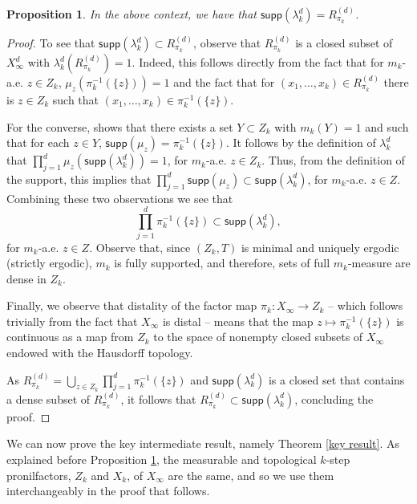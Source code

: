 \documentclass[reqno]{amsart}
\newcommand{\supp}{\mathsf{supp}}
\newtheorem{proposition}[theorem]{Proposition}
\theoremstyle{definition}
\theoremstyle{remark}
\begin{document}
\begin{proposition}\label{support trick}
In the above context, we have that $\supp(\lambda^d_k)=R^{(d)}_{\pi_k}$.    
\end{proposition}

\begin{proof}
To see that $\supp(\lambda^d_k) \subset R^{(d)}_{\pi_k}$, 
observe 
that $R^{(d)}_{\pi_k}$ is a closed subset of $X_{\infty}^d$ with $\lambda^d_k(R^{(d)}_{\pi_k})=1$. Indeed, this follows directly from the fact that for 
$m_k$-a.e. $z\in Z_k$, $\mu_z(\pi_k^{-1}(\{z\}))=1$ and the fact that for $(x_1,\ldots,x_k)\in R^{(d)}_{\pi_k}$ there is $z\in Z_k$ such that $(x_1,\ldots,x_k)\in \pi_k^{-1}(\{z\})$. 

For the converse, \cite[Proposition 5.5]{Glasner_Huang_Shao_Ye_regionally_arithmetic_prog_nil:2020} shows that there exists a set $Y\subset Z_k$ with $m_k(Y)=1$ and such that for each $z\in Y$, $\supp(\mu_z)=\pi_k^{-1}(\{z\})$. It follows by the definition of $\lambda^d_k$ that $\prod_{j=1}^d \mu_z(\supp(\lambda^d_k))=1$, for $m_k$-a.e. $z\in Z_k$. Thus, from the definition of the support, this implies that $\prod_{j=1}^d \supp(\mu_z) \subset \supp(\lambda^d_k)$, for $m_k$-a.e. $z\in Z$. Combining these two observations we see that 
$$\prod_{j=1}^d \pi_k^{-1}(\{z\}) \subset \supp(\lambda^d_k),$$
for $m_k$-a.e. $z\in Z$. Observe that, since $(Z_k,T)$ is minimal and uniquely ergodic (strictly ergodic), $m_k$ is fully supported, and therefore, sets of full $m_k$-measure are dense in $Z_k$. 

    Finally, we observe that distality of the factor map $\pi_k:X_{\infty}\to Z_k$ -- which follows trivially from the fact that $X_{\infty}$ is distal -- means that the map $z\mapsto \pi_k^{-1}(\{z\})$ is continuous as a map from $Z_k$ to the space of nonempty closed subsets of $X_{\infty}$ endowed with the Hausdorff topology. 
    
     As $ R^{(d)}_{\pi_k}= \bigcup_{z\in Z_k} \prod_{j=1}^d \pi_k^{-1}(\{z\})$ and $\supp(\lambda^d_k)$ is a closed set that contains a dense subset of $R^{(d)}_{\pi_k}$, it follows that $R^{(d)}_{\pi_k} \subset \supp(\lambda^d_k)$, concluding the proof.  
\end{proof}

We can now prove the key intermediate result, namely Theorem 
\ref{key result}. As explained before Proposition 
\ref{support trick}, the measurable and topological $k$-step 
pronilfactors, $Z_k$ and $X_k$, of $X_{\infty}$ are the same, 
and so we use them interchangeably in the proof that follows.
\end{document}
